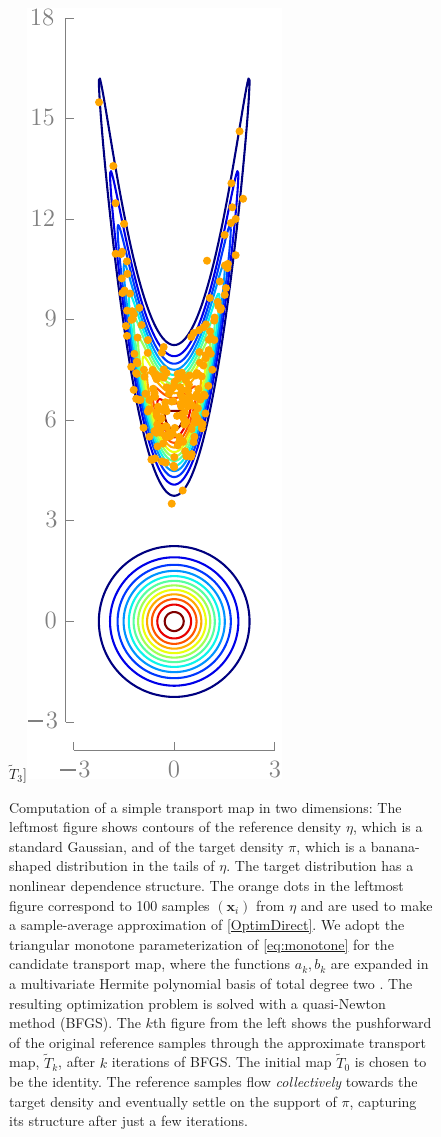 \documentclass[twoside,11pt]{article}
\newcommand{\xb}{\boldsymbol{x}}
\begin{document}
\begin{figure}[h]
\begin{center}
$\widetilde{T}_3$]{\includegraphics[scale=\scaleToolMovie]{toolExample_frame5-eps-converted-to.pdf}}
\caption[]{Computation of a simple transport map in two dimensions:
  The leftmost figure shows contours of the reference density
  $\eta$, which is a standard Gaussian, and of the target density
  $\pi$, which is a banana-shaped distribution in the tails of $\eta$.
  The target distribution has a nonlinear dependence structure. The
  orange dots in the leftmost figure correspond to 100 samples
  $(\xb_i)$ from $\eta$ and are used to make a sample-average
  approximation of \eqref{OptimDirect}.  We adopt the triangular
  monotone parameterization of \eqref{eq:monotone} for the candidate
  transport map, where the functions $a_k,b_k$ are expanded in a
  multivariate Hermite polynomial basis of total degree two
  \citep{xiu2010numerical}.  The resulting optimization problem is
  solved with a quasi-Newton method (BFGS).  The $k$th figure from the
  left shows the pushforward of the original reference samples through
  the approximate transport map, $\widetilde{T}_k$, after $k$
  iterations of BFGS. The initial map $\widetilde{T}_0$ is chosen to
  be the identity.
  The reference samples flow \emph{collectively} towards the target
  density and eventually settle on the support of $\pi$, capturing its
  structure after just a few iterations.}
 \label{fig:movieToyProblem} 
\end{center}
%
\end{figure}
%
\end{document}
